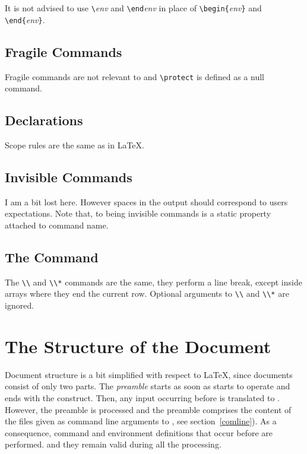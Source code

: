 It is not advised to use \verb+\+\textit{env} and
\verb+\end+\textit{env} in place of \verb+\begin{+\textit{env}\verb+}+ and
\verb+\end{+\textit{env}\verb+}+.

\subsection{Fragile Commands}
Fragile commands are not relevant to \hevea{} and \verb+\protect+ is
defined as a null command.

\subsection{Declarations}
Scope rules are the same as in \LaTeX.

\subsection{Invisible Commands}
I am a bit lost here. However spaces in the output should correspond
to users expectations. Note that, to \hevea{} being
invisible commands is a static property attached to command name.

\subsection{The \texttt{} Command}

The \verb+\\+ and \verb+\\*+ commands are the same, they perform a
line break, except inside arrays where they end the current row.
Optional arguments to \verb+\\+ and \verb+\\*+ are ignored.


\section{The Structure of the Document}\label{structure}
Document structure is a bit simplified with respect to \LaTeX{}, since
documents consist of only two parts.
The \emph{preamble} starts as soon as \hevea{} starts to operate and
ends with the \verb++ construct.
Then, any input occurring before
\verb++ is translated to \html{}.
However, the preamble is processed
and the preamble comprises the content of the files given as command line
arguments to \hevea{}, see section~\ref{comline}).
As a consequence, command and environment  definitions that
occur  before \verb++ are performed.
and they remain
valid during all the processing.

